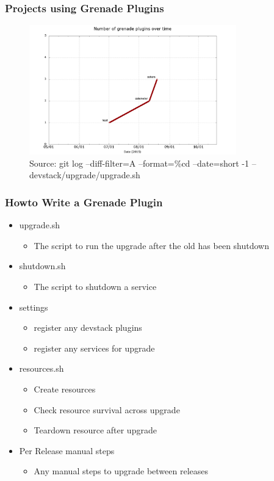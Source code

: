 \documentclass[aspectratio=169,11pt,hyperref={colorlinks=true}]{beamer}
\begin{document}
\begin{frame}
	\frametitle{Projects using Grenade Plugins}
    \begin{figure}[p]
    	\centering
    	\includegraphics[width=0.8\textwidth]{grenade-plugins.png}
    	\caption{Source: git log --diff-filter=A --format=\%cd --date=short -1 -- devstack/upgrade/upgrade.sh}
    \end{figure}
\end{frame}

\begin{frame}
    \frametitle{Howto Write a Grenade Plugin}
    \begin{itemize}
    \item upgrade.sh
        \begin{itemize}
            \item The script to run the upgrade after the old has been shutdown
        \end{itemize}
    \item shutdown.sh
        \begin{itemize}
            \item The script to shutdown a service
        \end{itemize}
    \item settings
        \begin{itemize}
            \item register any devstack plugins
            \item register any services for upgrade
        \end{itemize}
    \item resources.sh
        \begin{itemize}
            \item Create resources
            \item Check resource survival across upgrade
            \item Teardown resource after upgrade
        \end{itemize}
    \item Per Release manual steps
        \begin{itemize}
            \item Any manual steps to upgrade between releases
        \end{itemize}
\end{itemize}
\end{frame}
\end{document}
